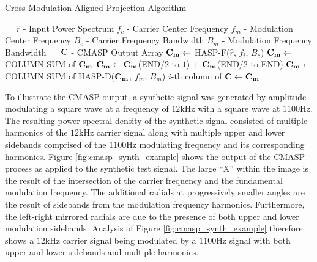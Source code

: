 \begin{algorithm}
	\caption{Cross-Modulation Aligned Projection Algorithm} \label{alg:cmaspalg}
	\scriptsize
	\centering
	\begin{algorithmic}[1]
		\Require~~
		\Statex $\hat{r}$ - Input Power Spectrum
		\Statex $f_c$ - Carrier Center Frequency 
		\Statex $f_m$ - Modulation Center Frequency 
		\Statex $B_c$ - Carrier Frequency Bandwidth
		\Statex $B_m$ - Modulation Frequency Bandwidth
		\Ensure~~
		\Statex $\bf{C}$ - CMASP Output Array
		\Statex
		\State    $\bf{C_m} \gets $ HASP-F($\hat{r}$, $f_i$, $B_c$)
		\State 		$\bf{C_m} \gets $ COLUMN SUM of $\bf{C_m}$
		\State 		$\bf{C_m} \gets \bf{C_m}$(END$/2$ to $1$) + $\bf{C_m}$(END$/2$ to END)
		\State		$\bf{C_m} \gets $ COLUMN SUM of HASP-D($\bf{C_m}$, $f_m$, $B_m$)
		\State		$i$-th column of $\bf{C} \gets \bf{C_m}$
		\EndFor
	\end{algorithmic}
\end{algorithm}

To illustrate the CMASP output, a synthetic signal was generated by amplitude modulating a square wave at a frequency of $12$kHz with a square wave at $1100$Hz.  The resulting power spectral density of the synthetic signal consisted of multiple harmonics of the $12$kHz carrier signal along with multiple upper and lower sidebands comprised of the $1100$Hz modulating frequency and its corresponding harmonics.   Figure \ref{fig:cmasp_synth_example} shows the output of the CMASP process as applied to the synthetic test signal.   The large ``X'' within the image is the result of the intersection of the carrier frequency and the fundamental modulation frequency.  The additional radials at progressively smaller angles are the result of sidebands from the modulation frequency harmonics.  Furthermore, the left-right mirrored radials are due to the presence of both upper and lower modulation sidebands.  Analysis of Figure \ref{fig:cmasp_synth_example} therefore shows a $12$kHz carrier signal being modulated by a $1100$Hz signal with both upper and lower sidebands and multiple harmonics.

